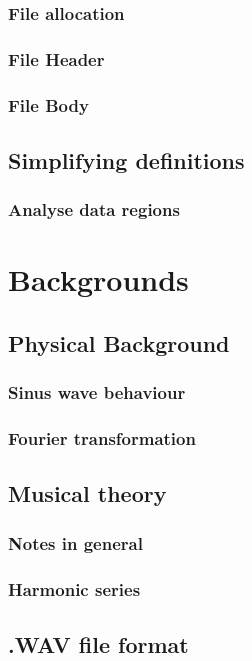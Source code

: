 \documentclass[a4paper,12pt]{report}
\begin{document}
	\subsection{File allocation}
	\subsection{File Header}
	\subsection{File Body}

	\section{Simplifying definitions}
	\subsection{Analyse data regions}
	
	\chapter{Backgrounds}
	
	\section{Physical Background}
	\subsection{Sinus wave behaviour}
	\subsection{Fourier transformation}
	
	\section{Musical theory}
	\subsection{Notes in general}
	\subsection{Harmonic series}
	
	\section{.WAV file format}
\end{document}
